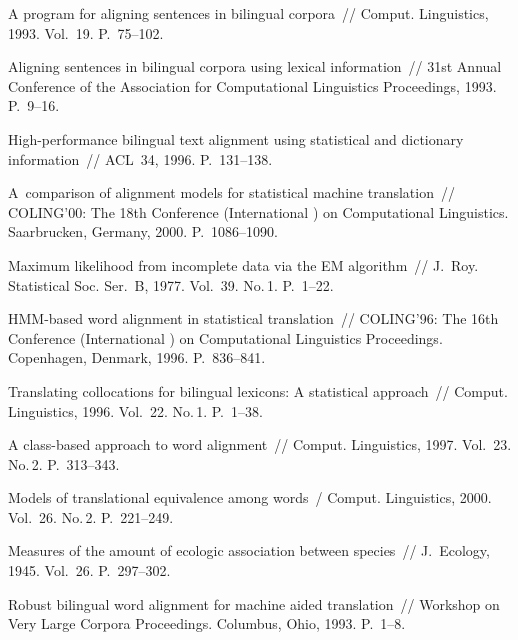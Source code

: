 \begin{multicols}{2}
{{\begin{thebibliography}{99}
    A program for aligning sentences in bilingual corpora~// Comput.
Linguistics, 1993. Vol.~19. P.~75--102.
    
    Aligning sentences in bilingual corpora using lexical information~// 
31st Annual Conference of the Association for Computational 
Linguistics Proceedings, 1993. P.~9--16.
    
    High-performance bilingual text alignment using statistical and dictionary 
information~// ACL~34, 1996. P.~131--138.
    
    A~comparison of alignment models for statistical machine translation~// 
COLING'00: The 18th Conference (International ) on Computational Linguistics. 
Saarbrucken, Germany, 2000. P.~1086--1090.
    
    Maximum likelihood from incomplete data via the EM algorithm~// 
    J.~Roy. Statistical Soc. Ser.~B, 1977. Vol.~39. No.\,1. P.~1--22.
    
    HMM-based word alignment in statistical translation~// COLING'96: The 
16th Conference (International ) on Computational Linguistics Proceedings. Copenhagen, 
Denmark, 1996. P.~836--841.
    
    Translating collocations for bilingual lexicons: A statistical approach~// 
Comput. Linguistics, 1996. Vol.~22. No.\,1. P.~1--38.
    
    A class-based approach to word alignment~// Comput. Linguistics, 
1997. Vol.~23. No.\,2. P.~313--343.
    
    Models of translational equivalence among words~/ Comput. 
Linguistics, 2000. Vol.~26. No.\,2. P.~221--249.
    
    Measures of the amount of ecologic association between species~// 
    J.~Ecology, 1945. Vol.~26. P.~297--302.
    
    Robust bilingual word alignment for machine aided translation~//  
Workshop on Very Large Corpora Proceedings. Columbus, Ohio, 1993. P.~1--8.
    

\end{thebibliography}}}
\end{multicols}
